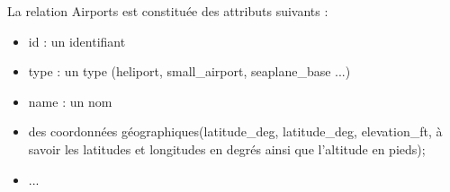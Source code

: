 \documentclass[10pt,fleqn]{article} %
\begin{document}
La relation \textsf{Airports} est constituée des attributs suivants : 
\begin{itemize}
\item \textsf{id} : un identifiant
\item \textsf{type} : un type (heliport, small\_airport, seaplane\_base ...)
\item \textsf{name} : un nom
\item des coordonnées géographiques(\textsf{latitude\_deg}, \textsf{latitude\_deg}, \textsf{elevation\_ft}, à savoir les latitudes et longitudes en degrés ainsi que l'altitude en pieds);
\item ...
\end{itemize}
\fi

%
%
%
%
%
%
\end{document}
